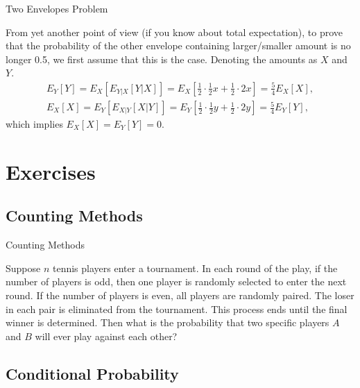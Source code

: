 \begin{frame}{Two Envelopes Problem}

\justifying
{} From yet another point of view (if you know about total expectation), to prove that the probability of the other envelope containing larger/smaller amount is no longer 0.5, we first assume that this is the case. Denoting the amounts as $X$ and $Y$.
\begin{align*}
E_{Y}[Y] = E_X\left[E_{Y|X}[Y|X]\right] = E_X\left[\frac{1}{2}\cdot \frac{1}{2}x + \frac{1}{2}\cdot 2x \right] = \frac{5}{4}E_X[X], \\
E_{X}[X] = E_Y\left[E_{X|Y}[X|Y]\right] = E_Y\left[\frac{1}{2}\cdot \frac{1}{2}y + \frac{1}{2}\cdot 2y \right] = \frac{5}{4}E_Y[Y],
\end{align*}
which implies $E_X[X] = E_Y[Y] = 0$.

\end{frame}

\section{Exercises}

\subsection{Counting Methods}

\begin{frame}{Counting Methods}


\justifying
{} Suppose $n$ tennis players enter a tournament. In each round of the play, if the number of players is odd, then one player is randomly selected to enter the next round. If the number of players is even, all players are randomly paired. The loser in each pair is eliminated from the tournament. This process ends until the final winner is determined. Then what is the probability that two specific players $A$ and $B$ will ever play against each other?

\end{frame}

\subsection{Conditional Probability}

